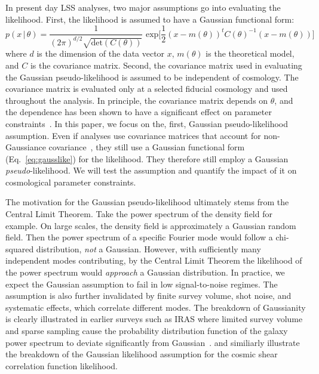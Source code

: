 \documentclass[12pt, letterpaper, preprint]{aastex}
\newcommand{\beq}{\begin{equation}}
\newcommand{\eeq}{\end{equation}}
\begin{document}
In present day LSS analyses, two major assumptions go into evaluating the 
likelihood. First, the likelihood is assumed to have a Gaussian functional 
form: 
\beq \label{eq:gausslike}
p(x\,|\,\theta) = \frac{1}{(2\pi)^{d/2} \sqrt{\mathrm{det}(C(\theta))}}\,\,\mathrm{exp}\bigg[\frac{1}{2}(x - m(\theta))^{t} C(\theta)^{-1} (x - m(\theta))\bigg]
\eeq
where $d$ is the dimension of the data vector $x$, $m(\theta)$ is the theoretical model, and $C$ 
is the covariance matrix. Second, the covariance matrix used in evaluating the Gaussian pseudo-likelihood
is assumed to be independent of cosmology. The covariance matrix is 
evaluated only at a selected fiducial cosmology and used throughout 
the analysis. In principle, the covariance matrix depends on $\theta$, 
and the dependence has been shown to have a significant effect 
on parameter constraints~\citep[\emph{e.g.}][]{eifler2009, morrison2013, white2015}. 
In this paper, we focus on the, first, Gaussian pseudo-likelihood assumption. 
Even if analyses use covariance matrices that account for non-Gaussiance 
covariance~\citep[\emph{e.g.}][]{scoccimarro1999, hu2001, oconnell2016}, 
they still use a Gaussian functional form (Eq.~\ref{eq:gausslike}) for 
the likelihood. They therefore still employ a Gaussian \emph{pseudo}-likelihood. 
We will test the assumption and quantify the impact of it on cosmological 
parameter constraints. 

The motivation for the Gaussian pseudo-likelihood ultimately stems 
from the Central Limit Theorem. Take the power spectrum of the density 
field for example. On large scales, the density field is approximately a 
Gaussian random field. Then the power spectrum of a specific Fourier 
mode would follow a chi-squared distribution, \emph{not} a Gaussian. 
However, with sufficiently many independent modes contributing, by the Central 
Limit Theorem the likelihood of the power spectrum would \emph{approach} a 
Gaussian distribution. In practice, we expect the Gaussian assumption 
to fail in low signal-to-noise regimes. The assumption is also further invalidated 
by finite survey volume, shot noise, and systematic effects, which correlate
different modes. The breakdown of Gaussianity is clearly illustrated in earlier 
surveys such as IRAS where limited survey volume and sparse sampling cause the 
probability distribution function of the galaxy power spectrum to deviate 
significantly from Gaussian~\citep[see Figure 9 in][]{scoccimarro2000}. 
\cite{hartlap2009} and \cite{sellentin2017} similiarly illustrate the breakdown
of the Gaussian likelihood assumption for the cosmic shear correlation function 
likelihood.
\end{document}
